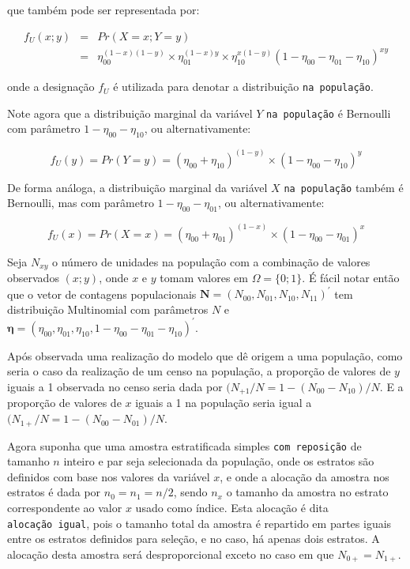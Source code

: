 \documentclass[]{book}
\theoremstyle{definition}
\theoremstyle{definition}
\theoremstyle{definition}
\theoremstyle{remark}
\begin{document}
que também pode ser representada por:

\begin{eqnarray}
 f_U (x ; y) &=& Pr( X = x ; Y = y )\\
             & =& \eta_{00}^{(1-x)(1-y)} \times \eta_{01}^{(1-x)y} \times \eta_{10}^{x(1-y)} (1 - \eta_{00} - \eta_{01} - \eta_{10})^{xy} \nonumber
\end{eqnarray}

onde a designação \(f_U\) é utilizada para denotar a distribuição
\texttt{na\ população}.

Note agora que a distribuição marginal da variável \(Y\)
\texttt{na\ população} é Bernoulli com parâmetro
\(1 - \eta_{00} - \eta_{10}\), ou alternativamente:

\begin{equation}
 f_U (y) = Pr( Y = y ) = (\eta_{00} + \eta_{10})^{(1-y)} \times (1 - \eta_{00} - \eta_{10})^y
\end{equation}

De forma análoga, a distribuição marginal da variável \(X\)
\texttt{na\ população} também é Bernoulli, mas com parâmetro
\(1 - \eta_{00} - \eta_{01}\), ou alternativamente:

\begin{equation}
 f_U (x) = Pr( X = x ) = (\eta_{00} + \eta_{01})^{(1-x)} \times (1 - \eta_{00} - \eta_{01})^x
\end{equation}

Seja \(N_{xy}\) o número de unidades na população com a combinação de
valores observados \((x;y)\), onde \(x\) e \(y\) tomam valores em
\(\Omega = \{ 0 ; 1 \}\). É fácil notar então que o vetor de contagens
populacionais
\(\mathbf{N} = ( N_{00}, N_{01}, N_{10}, N_{11} )^{\prime}\) tem
distribuição Multinomial com parâmetros \(N\) e
\(\mathbf{\eta} = (\eta_{00} , \eta_{01} , \eta_{10} , 1 - \eta_{00} - \eta_{01} - \eta_{10} )^{\prime}\).

Após observada uma realização do modelo que dê origem a uma população,
como seria o caso da realização de um censo na população, a proporção de
valores de \(y\) iguais a 1 observada no censo seria dada por
\((N_{+1} / N = 1 - (N_{00} - N_{10})/N\). E a proporção de valores de
\(x\) iguais a 1 na população seria igual a
\((N_{1+} / N = 1 - (N_{00} - N_{01})/N\).

Agora suponha que uma amostra estratificada simples
\texttt{com\ reposição} de tamanho \(n\) inteiro e par seja selecionada
da população, onde os estratos são definidos com base nos valores da
variável \(x\), e onde a alocação da amostra nos estratos é dada por
\(n_0 = n_1 = n/2\), sendo \(n_x\) o tamanho da amostra no estrato
correspondente ao valor \(x\) usado como índice. Esta alocação é dita
\texttt{alocação\ igual}, pois o tamanho total da amostra é repartido em
partes iguais entre os estratos definidos para seleção, e no caso, há
apenas dois estratos. A alocação desta amostra será desproporcional
exceto no caso em que \(N_{0+} = N_{1+}\).
\end{document}
